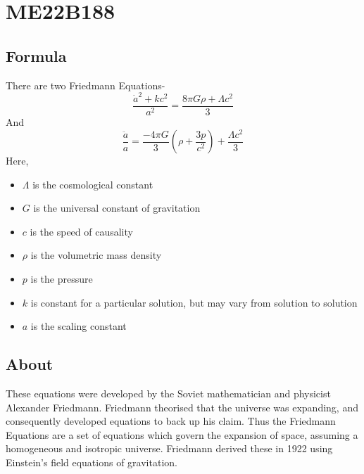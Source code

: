 %

%

\section{ME22B188}
\subsection{Formula}
There are two Friedmann Equations-
\begin{equation} 
\label{eqn1}
\frac{\dot{a}^2 + k c^2}{a^2} = \frac{8 \pi G \rho + \Lambda c^2}{3}
\end{equation} 
And
\begin{equation}
\label{eqn2}
\frac{\ddot{a}}{a} = \frac{-4 \pi G}{3} \left(\rho + \frac{3p} {c^2}\right) + \frac{\Lambda c^2}{3}
\end{equation}
Here,
\begin{itemize}
    \item $\Lambda$ is the cosmological constant
    \item $G$ is the universal constant of gravitation
    \item $c$ is the speed of causality
    \item $\rho$ is the volumetric mass density
    \item $p$ is the pressure
    \item $k$ is constant for a particular solution, but may vary from solution to solution
    \item $a$ is the scaling constant
\end{itemize}

\subsection{About}
These equations were developed by the Soviet mathematician and physicist Alexander Friedmann. Friedmann theorised that the universe was expanding, and consequently developed equations to back up his claim.
Thus the Friedmann Equations are a set of equations which govern the expansion of space, assuming a homogeneous and isotropic universe. Friedmann derived these in 1922 using Einstein's field equations of gravitation.
